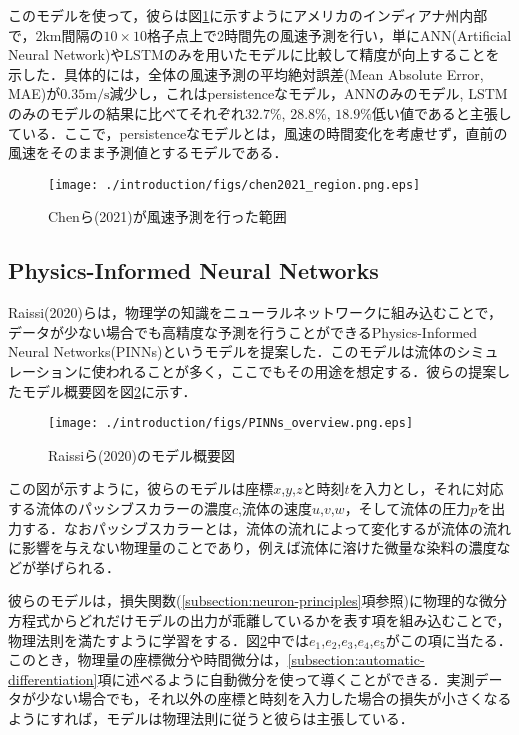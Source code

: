このモデルを使って，彼らは図\ref{fig:chen2021_region}に示すようにアメリカのインディアナ州内部で，2km間隔の$10 \times 10$格子点上で2時間先の風速予測を行い，単にANN(Artificial Neural Network)\cite{485891}やLSTMのみを用いたモデルに比較して精度が向上することを示した．具体的には，全体の風速予測の平均絶対誤差(Mean Absolute Error, MAE)が$0.35 \mathrm{m/s}$減少し，これはpersistenceなモデル，ANNのみのモデル, LSTMのみのモデルの結果に比べてそれぞれ$32.7\%$, $28.8\%$, $18.9\%$低い値であると主張している．ここで，persistenceなモデルとは，風速の時間変化を考慮せず，直前の風速をそのまま予測値とするモデルである．
\begin{figure}[bp]
    \centering
    \texttt{[image: ./introduction/figs/chen2021\_region.png.eps]}
    \caption{Chenら(2021)が風速予測を行った範囲\cite{CHEN2021114451}}
    \label{fig:chen2021_region}
\end{figure}

\subsection{Physics-Informed Neural Networks}
Raissi(2020)らは，物理学の知識をニューラルネットワークに組み込むことで，データが少ない場合でも高精度な予測を行うことができるPhysics-Informed Neural Networks(PINNs)というモデルを提案した\cite{PINNs2020}．このモデルは流体のシミュレーションに使われることが多く\cite{app13126892}，ここでもその用途を想定する．彼らの提案したモデル概要図を図\ref{fig:pinns-overview}に示す．
\begin{figure}[bp]
    \centering
    \texttt{[image: ./introduction/figs/PINNs\_overview.png.eps]}
    \caption{Raissiら(2020)のモデル概要図\cite{PINNs2020}}
    \label{fig:pinns-overview}
\end{figure}
この図が示すように，彼らのモデルは座標$x$,$y$,$z$と時刻$t$を入力とし，それに対応する流体のパッシブスカラーの濃度$c$,流体の速度$u$,$v$,$w$，そして流体の圧力$p$を出力する．なおパッシブスカラーとは，流体の流れによって変化するが流体の流れに影響を与えない物理量のことであり，例えば流体に溶けた微量な染料の濃度などが挙げられる\cite{Lesieur1990}．

彼らのモデルは，損失関数(\ref{subsection:neuron-principles}項参照)に物理的な微分方程式からどれだけモデルの出力が乖離しているかを表す項を組み込むことで，物理法則を満たすように学習をする．図\ref{fig:pinns-overview}中では$e_1$,$e_2$,$e_3$,$e_4$,$e_5$がこの項に当たる．このとき，物理量の座標微分や時間微分は，\ref{subsection:automatic-differentiation}項に述べるように自動微分を使って導くことができる．実測データが少ない場合でも，それ以外の座標と時刻を入力した場合の損失が小さくなるようにすれば，モデルは物理法則に従うと彼らは主張している．

